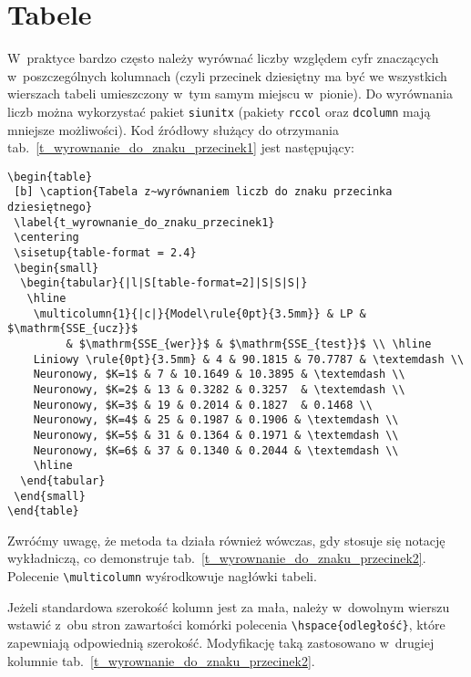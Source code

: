 \chapter{Tabele}
W~praktyce bardzo często należy wyrównać liczby względem cyfr znaczących w~poszczególnych kolumnach (czyli przecinek dziesiętny ma być we wszystkich wierszach tabeli umieszczony w~tym samym miejscu w~pionie). Do wyrównania liczb można wykorzystać pakiet \verb+siunitx+ (pakiety \verb+rccol+ oraz \verb+dcolumn+ mają mniejsze możliwości). Kod źródłowy służący do otrzymania tab.~\ref{t_wyrownanie_do_znaku_przecinek1} jest następujący:
\begin{lstlisting}[style=customlatex,frame=single]
\begin{table}
 [b] \caption{Tabela z~wyrównaniem liczb do znaku przecinka dziesiętnego}
 \label{t_wyrownanie_do_znaku_przecinek1}
 \centering
 \sisetup{table-format = 2.4}
 \begin{small}
  \begin{tabular}{|l|S[table-format=2]|S|S|S|}
   \hline
    \multicolumn{1}{|c|}{Model\rule{0pt}{3.5mm}} & LP & $\mathrm{SSE_{ucz}}$ 
		 & $\mathrm{SSE_{wer}}$ & $\mathrm{SSE_{test}}$ \\ \hline
    Liniowy \rule{0pt}{3.5mm} & 4 & 90.1815 & 70.7787 & \textemdash \\
    Neuronowy, $K=1$ & 7 & 10.1649 & 10.3895 & \textemdash \\
    Neuronowy, $K=2$ & 13 & 0.3282 & 0.3257  & \textemdash \\
    Neuronowy, $K=3$ & 19 & 0.2014 & 0.1827  & 0.1468 \\
    Neuronowy, $K=4$ & 25 & 0.1987 & 0.1906 & \textemdash \\
    Neuronowy, $K=5$ & 31 & 0.1364 & 0.1971 & \textemdash \\
    Neuronowy, $K=6$ & 37 & 0.1340 & 0.2044 & \textemdash \\
    \hline
  \end{tabular}
 \end{small}
\end{table}
\end{lstlisting}
Zwróćmy uwagę, że metoda ta działa również wówczas, gdy stosuje się notację wykładniczą, co demonstruje tab.~\ref{t_wyrownanie_do_znaku_przecinek2}. Polecenie \verb+\multicolumn+ wyśrodkowuje nagłówki tabeli.

Jeżeli standardowa szerokość kolumn jest za mała, należy w~dowolnym wierszu wstawić z~obu stron zawartości komórki polecenia \verb+\hspace{odległość}+, które zapewniają odpowiednią szerokość. Modyfikację taką zastosowano w~drugiej kolumnie tab.~\ref{t_wyrownanie_do_znaku_przecinek2}.

